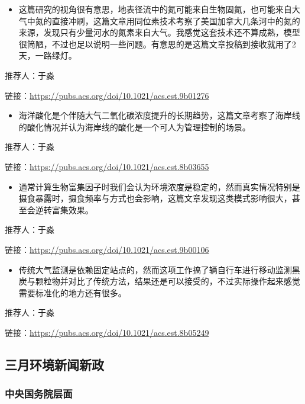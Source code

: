 \documentclass[
]{book}
\providecommand{\tightlist}{%
  \setlength{\itemsep}{0pt}\setlength{\parskip}{0pt}}
\begin{document}
\begin{itemize}
\tightlist
\item
  这篇研究的视角很有意思，地表径流中的氮可能来自生物固氮，也可能来自大气中氮的直接冲刷，这篇文章用同位素技术考察了美国加拿大几条河中的氮的来源，发现只有少量河水的氮素来自大气。我感觉这套技术还不算成熟，模型很简陋，不过也足以说明一些问题。有意思的是这篇文章投稿到接收就用了2天，一路绿灯。
\end{itemize}

推荐人：于淼

链接：\url{https://pubs.acs.org/doi/10.1021/acs.est.9b01276}

\begin{itemize}
\tightlist
\item
  海洋酸化是个伴随大气二氧化碳浓度提升的长期趋势，这篇文章考察了海岸线的酸化情况并认为海岸线的酸化是一个可人为管理控制的场景。
\end{itemize}

推荐人：于淼

链接：\url{https://pubs.acs.org/doi/10.1021/acs.est.8b03655}

\begin{itemize}
\tightlist
\item
  通常计算生物富集因子时我们会认为环境浓度是稳定的，然而真实情况特别是摄食暴露时，摄食频率与方式也会影响，这篇文章发现这类模式影响很大，甚至会逆转富集效果。
\end{itemize}

推荐人：于淼

链接：\url{https://pubs.acs.org/doi/10.1021/acs.est.9b00106}

\begin{itemize}
\tightlist
\item
  传统大气监测是依赖固定站点的，然而这项工作搞了辆自行车进行移动监测黑炭与颗粒物并对比了传统方法，结果还是可以接受的，不过实际操作起来感觉需要标准化的地方还有很多。
\end{itemize}

推荐人：于淼

链接：\url{https://pubs.acs.org/doi/10.1021/acs.est.8b05249}

\hypertarget{ux4e09ux6708ux73afux5883ux65b0ux95fbux65b0ux653f}{%
\subsection*{三月环境新闻新政}\label{ux4e09ux6708ux73afux5883ux65b0ux95fbux65b0ux653f}}

\hypertarget{ux4e2dux592eux56fdux52a1ux9662ux5c42ux9762-1}{%
\subsubsection*{中央国务院层面}\label{ux4e2dux592eux56fdux52a1ux9662ux5c42ux9762-1}}
\end{document}
